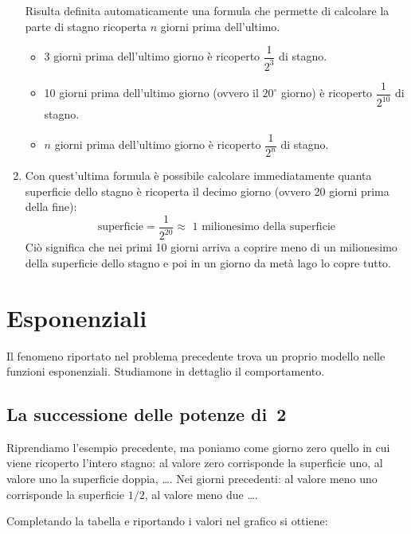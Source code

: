 \begin{enumerate}
Risulta definita automaticamente una formula che permette di calcolare la parte di stagno ricoperta
$n$ giorni prima dell'ultimo.
\begin{itemize}
 \item 3 giorni prima dell'ultimo giorno è ricoperto $\dfrac{1}{2^3}$ di stagno.
 \item 10 giorni prima dell'ultimo giorno (ovvero il $20^\circ$ giorno) è ricoperto $\dfrac{1}{2^{10}}$ di stagno.
 \item $n$ giorni prima dell'ultimo giorno è ricoperto $\dfrac{1}{2^{n}}$ di stagno.
\end{itemize}

\item Con quest'ultima formula è possibile calcolare immediatamente quanta 
superficie dello stagno è ricoperta il decimo giorno (ovvero 20 giorni prima della fine):
\[\text{superficie} = \dfrac{1}{2^{20}} \approx 
\text{ 1 milionesimo della superficie}\]
Ciò significa che nei primi 10 giorni arriva a coprire meno di un milionesimo 
della superficie dello stagno e poi in un giorno da metà lago lo copre tutto.
\end{enumerate}

\section{Esponenziali}
\label{sec:esplog_esponenziali}

Il fenomeno riportato nel problema precedente trova un proprio modello nelle 
funzioni esponenziali. Studiamone in dettaglio il comportamento.

\subsection{La successione delle potenze di~2}
\label{subsec:esplog_succpotdue}

Riprendiamo l'esempio precedente, ma poniamo come giorno zero quello in cui viene 
ricoperto l'intero stagno: al valore zero corrisponde la superficie uno, al 
valore uno la superficie doppia, \dots. Nei giorni precedenti: al valore meno uno 
corrisponde la superficie $1/2$, al valore meno due \dots.

Completando la tabella e riportando i valori nel grafico si ottiene:

